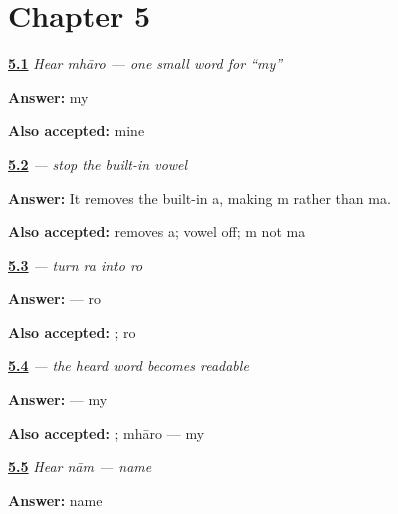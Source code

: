 \section*{Chapter 5}

\noindent\begin{minipage}[t]{\linewidth}
\raggedright
\hyperlink{review-MW-C05-hear-mharo-meaning}{\textbf{5.1}} \emph{Hear \emph{mhāro} — one small word for \textquotedblleft{}my\textquotedblright{}}\par
\small \textbf{Answer:} my\par
\footnotesize \textbf{Also accepted:} mine
\end{minipage}\par\medskip

\noindent\begin{minipage}[t]{\linewidth}
\raggedright
\hyperlink{review-MW-W05-virama-function}{\textbf{5.2}} \emph{ — stop the built-in vowel}\par
\small \textbf{Answer:} It removes the built-in a, making m rather than ma.\par
\footnotesize \textbf{Also accepted:} removes a; vowel off; m not ma
\end{minipage}\par\medskip

\noindent\begin{minipage}[t]{\linewidth}
\raggedright
\hyperlink{review-MW-W05-o-matra-read}{\textbf{5.3}} \emph{ — turn \emph{ra} into \emph{ro}}\par
\small \textbf{Answer:}  — ro\par
\footnotesize \textbf{Also accepted:} ; ro
\end{minipage}\par\medskip

\noindent\begin{minipage}[t]{\linewidth}
\raggedright
\hyperlink{review-MW-C05-mharo-delayed}{\textbf{5.4}} \emph{ — the heard word becomes readable}\par
\small \textbf{Answer:}  — my\par
\footnotesize \textbf{Also accepted:} ; mhāro — my
\end{minipage}\par\medskip

\noindent\begin{minipage}[t]{\linewidth}
\raggedright
\hyperlink{review-MW-C05-hear-naam-meaning}{\textbf{5.5}} \emph{Hear \emph{nām} — name}\par
\small \textbf{Answer:} name\par
\end{minipage}\par\medskip


